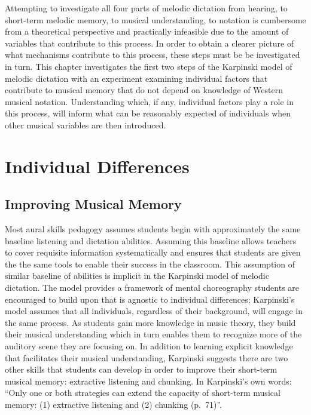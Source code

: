 \documentclass[12pt,]{book}
\begin{document}
Attempting to investigate all four parts of melodic dictation from hearing, to short-term melodic memory, to musical understanding, to notation is cumbersome from a theoretical perspective and practically infeasible due to the amount of variables that contribute to this process.
In order to obtain a clearer picture of what mechanisms contribute to this process, these steps must be be investigated in turn.
This chapter investigates the first two steps of the Karpinski model of melodic dictation \citep{karpinskiAuralSkillsAcquisition2000, karpinskiModelMusicPerception1990} with an experiment examining individual factors that contribute to musical memory that do not depend on knowledge of Western musical notation.
Understanding which, if any, individual factors play a role in this process, will inform what can be reasonably expected of individuals when other musical variables are then introduced.

\hypertarget{individual-differences-1}{%
\section{Individual Differences}\label{individual-differences-1}}

\hypertarget{improving-musical-memory}{%
\subsection{Improving Musical Memory}\label{improving-musical-memory}}

Most aural skills pedagogy assumes students begin with approximately the same baseline listening and dictation abilities.
Assuming this baseline allows teachers to cover requisite information systematically and ensures that students are given the the same tools to enable their success in the classroom.
This assumption of similar baseline of abilities is implicit in the Karpinski model of melodic dictation.
The model provides a framework of mental choreography students are encouraged to build upon that is agnostic to individual differences; Karpinski's model assumes that all individuals, regardless of their background, will engage in the same process.
As students gain more knowledge in music theory, they build their musical understanding which in turn enables them to recognize more of the auditory scene they are focusing on.
In addition to learning explicit knowledge that facilitates their musical understanding, Karpinski suggests there are two other skills that students can develop in order to improve their short-term musical memory: extractive listening and chunking.
In Karpinski's own words: ``Only one or both strategies can extend the capacity of short-term musical memory: (1) extractive listening and (2) chunking (p.~71)''.
\end{document}
